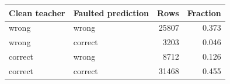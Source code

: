 \begin{tabular}{llrr}
\toprule
Clean teacher & Faulted prediction & Rows & Fraction \\
\midrule
wrong & wrong & 25807 & 0.373 \\
wrong & correct & 3203 & 0.046 \\
correct & wrong & 8712 & 0.126 \\
correct & correct & 31468 & 0.455 \\
\bottomrule
\end{tabular}